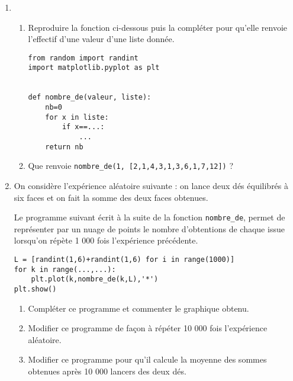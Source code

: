 \documentclass[
	classe=$2^{de}$,
	headerTitle=Python
]{informatique}
\begin{document}
\begin{enumerate}
	\item \begin{enumerate}
		      \item Reproduire la fonction ci-dessous puis la compléter pour qu’elle renvoie l’effectif d’une valeur d’une liste donnée.

		            \begin{lstlisting}
from random import randint
import matplotlib.pyplot as plt


def nombre_de(valeur, liste):
	nb=0
	for x in liste:
		if x==...:
			...
	return nb
\end{lstlisting}
		      \item Que renvoie \texttt{nombre\_de(1, [2,1,4,3,1,3,6,1,7,12])} ?
	      \end{enumerate}
	\item On considère l'expérience aléatoire suivante : on lance deux dés équilibrés à six faces et on fait la somme des deux faces obtenues.

	      Le programme suivant écrit à la suite de la fonction \texttt{nombre\_de}, permet de représenter par un nuage de points le nombre d’obtentions de chaque issue lorsqu’on répète 1 000 fois  l’expérience précédente.

	      \begin{lstlisting}
L = [randint(1,6)+randint(1,6) for i in range(1000)]
for k in range(...,...):
	plt.plot(k,nombre_de(k,L),'*')
plt.show()
\end{lstlisting}

	      \begin{enumerate}
		      \item Compléter ce programme et commenter le graphique obtenu.
		      \item Modifier ce programme de façon à répéter 10 000 fois l'expérience aléatoire.
		      \item Modifier ce programme pour qu’il calcule la moyenne des sommes obtenues après 10 000 lancers des deux dés.
	      \end{enumerate}
\end{enumerate}
\end{document}
